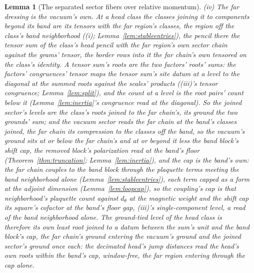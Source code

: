 \documentclass[11pt]{article}
\newtheorem{lemma}{Lemma}
\theoremstyle{definition}
\begin{document}
\begin{lemma}[The separated sector fibers over relative momentum]
\emph{(iv) The far dressing is the vacuum's own.} At a head class
the classes joining it to components beyond its band are its
tensors with the far region's classes, the region off the class's
band neighborhood ((i); Lemma~\ref{lem:stableentries}), the pencil
there the tensor sum of the class's head pencil with the far
region's own sector chain against the grams' tensor, the border
rows into it the far chain's own tensored on the class's identity.
A tensor sum's roots are the two factors' roots' sums: the
factors' congruences' tensor maps the tensor sum's site datum at a
level to the diagonal at the summed roots against the scales'
products ((iii)'s tensor congruence; Lemma~\ref{lem:split}), and
the count at a level is the root pairs' count below it
(Lemma~\ref{lem:inertia}'s congruence read at the diagonal). So
the joined sector's levels are the class's roots joined to the far
chain's, its ground the two grounds' sum; and the vacuum sector
reads the far chain at the band's classes joined, the far chain
its compression to the classes off the band, so the vacuum's
ground sits at or below the far chain's and at or beyond it less
the band block's shift cap, the removed block's polarization read
at the band's floor (Theorem~\ref{thm:truncation};
Lemma~\ref{lem:inertia}), and the cap is the band's own: the far
chain couples to the band block through the plaquette terms meeting
the band neighborhood alone (Lemma~\ref{lem:stableentries}), each
term capped as a form at the adjoint dimension
(Lemma~\ref{lem:loopcap}), so the coupling's cap is that
neighborhood's plaquette count against $d_\theta$ at the magnetic
weight and the shift cap its square's cofactor at the band's floor
gap, (iii)'s single-component level, a read of the band
neighborhood alone. The ground-tied level of the head class
is therefore its own least root joined to a datum between the sum's
unit and the band block's cap, the far chain's ground entering the
vacuum's ground and the joined sector's ground once each: the
decimated head's jump distances read the head's own roots within
the band's cap, window-free, the far region entering through the
cap alone.

\end{lemma}
\end{document}
